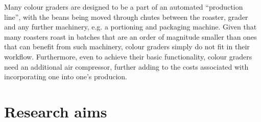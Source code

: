 \begin{itemize}
\begin{itemize}
        Many colour graders are designed to be a part of an automated ``production line'', with the beans being moved through
        chutes between the roaster, grader and any further machinery, e.g. a portioning and packaging machine.
        Given that many roasters roast in batches that are an order of magnitude smaller than ones that can benefit from such machinery,
        colour graders simply do not fit in their workflow.
        Furthermore, even to achieve their basic functionality, colour graders need an additional air compressor,
        further adding to the costs associated with incorporating one into one's producion.
    \end{itemize}
\end{itemize}


\section{Research aims}\label{sec:research-aims}
